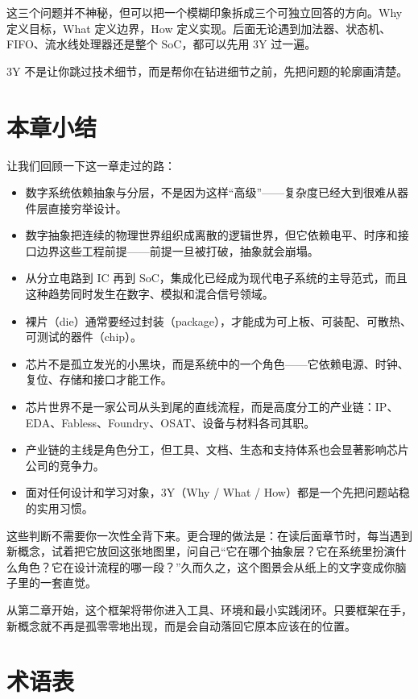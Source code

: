 \documentclass[11pt,a4paper]{article}
\begin{document}
这三个问题并不神秘，但可以把一个模糊印象拆成三个可独立回答的方向。Why 定义目标，What 定义边界，How 定义实现。后面无论遇到加法器、状态机、FIFO、流水线处理器还是整个 SoC，都可以先用 3Y 过一遍。

\begin{tipbox}
3Y 不是让你跳过技术细节，而是帮你在钻进细节之前，先把问题的轮廓画清楚。
\end{tipbox}

\section{本章小结}

让我们回顾一下这一章走过的路：

\begin{itemize}
  \item 数字系统依赖抽象与分层，不是因为这样``高级''——复杂度已经大到很难从器件层直接穷举设计。
  \item 数字抽象把连续的物理世界组织成离散的逻辑世界，但它依赖电平、时序和接口边界这些工程前提——前提一旦被打破，抽象就会崩塌。
  \item 从分立电路到 IC 再到 SoC，集成化已经成为现代电子系统的主导范式，而且这种趋势同时发生在数字、模拟和混合信号领域。
  \item 裸片（die）通常要经过封装（package），才能成为可上板、可装配、可散热、可测试的器件（chip）。
  \item 芯片不是孤立发光的小黑块，而是系统中的一个角色——它依赖电源、时钟、复位、存储和接口才能工作。
  \item 芯片世界不是一家公司从头到尾的直线流程，而是高度分工的产业链：IP、EDA、Fabless、Foundry、OSAT、设备与材料各司其职。
  \item 产业链的主线是角色分工，但工具、文档、生态和支持体系也会显著影响芯片公司的竞争力。
  \item 面对任何设计和学习对象，3Y（Why / What / How）都是一个先把问题站稳的实用习惯。
\end{itemize}

这些判断不需要你一次性全背下来。更合理的做法是：在读后面章节时，每当遇到新概念，试着把它放回这张地图里，问自己``它在哪个抽象层？它在系统里扮演什么角色？它在设计流程的哪一段？''久而久之，这个图景会从纸上的文字变成你脑子里的一套直觉。

从第二章开始，这个框架将带你进入工具、环境和最小实践闭环。只要框架在手，新概念就不再是孤零零地出现，而是会自动落回它原本应该在的位置。

\section{术语表}
\end{document}
